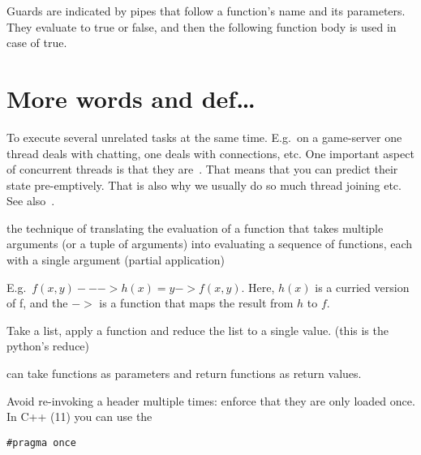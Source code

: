 \begin{definition}[Guards]
    Guards are indicated by pipes that follow a function's name and its
    parameters. They evaluate to true or false, and then the following
    function body is used in case of true.

\end{definition}

\section{More words and def\dots}


\begin{definition}[Concurrency]\label{concurrency}
    To execute several unrelated tasks at the same time. E.g.\ on a game-server
    one thread deals with chatting, one deals with connections, etc.
    One important aspect of concurrent threads is that they
    are~. That means that you can predict their
    state pre-emptively. That is also why we usually do so much thread joining
    etc.
    See also~.

\end{definition}

\begin{definition}[Currying]
    the technique of translating the evaluation of a function that takes
    multiple arguments (or a tuple of arguments) into evaluating a sequence of
    functions, each with a single argument (partial application)

    E.g.\ $f(x,y) ---> h(x) = y -> f(x, y)$.
    Here, $h(x)$ is a curried version of f, and the $->$ is a function that
    maps the result from $h$ to $f$.
\end{definition}

\begin{definition}[Folding]
    Take a list, apply a function and reduce the list to a single value.
    (this is the python's reduce)

\end{definition}

\begin{definition}
    can take functions as parameters and return functions as return values.

\end{definition}

\begin{definition}
    Avoid re-invoking a header multiple times: enforce that they are only 
    loaded once. In C++ (11) you can use the 
    \begin{verbatim}#pragma once\end{verbatim}
\end{definition}

